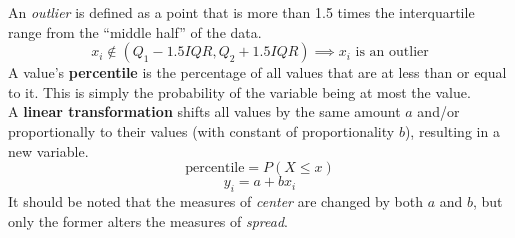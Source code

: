 \documentclass[../AP_Statistics.tex]{subfiles}
\begin{document}
			An \emph{outlier} is defined as a point that is more than 1.5 times the interquartile range from the \enquote{middle half} of the data.
			\[x_i\notin (Q_1 - 1.5IQR, Q_2 + 1.5IQR) \implies x_i \text{ is an outlier}\]
			A value's \textbf{percentile} is the percentage of all values that are at less than or equal to it. This is simply the probability of the variable being at most the value. \\
			A \textbf{linear transformation} shifts all values by the same amount $a$ and/or proportionally to their values (with constant of proportionality $b$), resulting in a new variable. 
			\[\mathrm{percentile} = P(X \le x)\]
			\[y_i = a + bx_i\]
			It should be noted that the measures of \emph{center} are changed by both $a$ and $b$, but only the former alters the measures of \emph{spread}. \\
\end{document}
